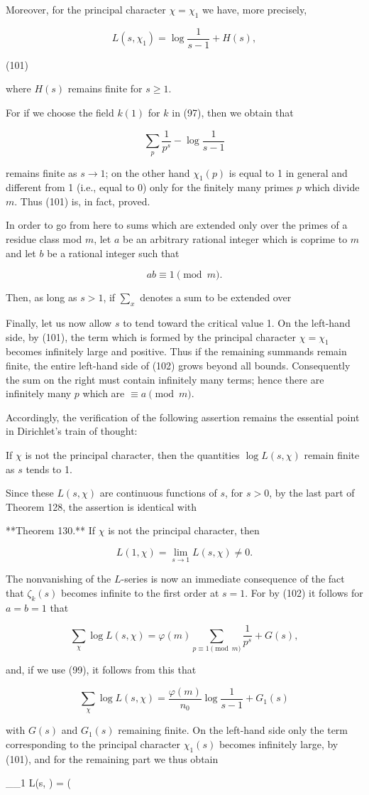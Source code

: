 Moreover, for the principal character $\chi = \chi_1$ we have, more precisely,

$$L(s,\chi_1) = \log \frac{1}{s-1} + H(s),$$

(101)

where $H(s)$ remains finite for $s \geq 1$.

For if we choose the field $k(1)$ for $k$ in (97), then we obtain that

$$\sum_p \frac{1}{p^s} - \log \frac{1}{s-1}$$

remains finite as $s \rightarrow 1$; on the other hand $\chi_1(p)$ is equal to 1 in general and different from 1 (i.e., equal to 0) only for the finitely many primes $p$ which divide $m$. Thus (101) is, in fact, proved.

In order to go from here to sums which are extended only over the primes of a residue class mod $m$, let $a$ be an arbitrary rational integer which is coprime to $m$ and let $b$ be a rational integer such that

$$ab \equiv 1 \pmod{m}.$$

Then, as long as $s > 1$, if $\sum_x$ denotes a sum to be extended over

Finally, let us now allow $s$ to tend toward the critical value 1. On the left-hand side, by (101), the term which is formed by the principal character $\chi = \chi_1$ becomes infinitely large and positive. Thus if the remaining summands remain finite, the entire left-hand side of (102) grows beyond all bounds. Consequently the sum on the right must contain infinitely many terms; hence there are infinitely many $p$ which are $\equiv a \pmod{m}$.

Accordingly, the verification of the following assertion remains the essential point in Dirichlet’s train of thought:

If $\chi$ is not the principal character, then the quantities $\log L(s, \chi)$ remain finite as $s$ tends to 1.

Since these $L(s, \chi)$ are continuous functions of $s$, for $s > 0$, by the last part of Theorem 128, the assertion is identical with

**Theorem 130.** If $\chi$ is not the principal character, then

$$L(1, \chi) = \lim_{s \to 1} L(s, \chi) \neq 0.$$

The nonvanishing of the $L$-series is now an immediate consequence of the fact that $\zeta_k(s)$ becomes infinite to the first order at $s = 1$. For by (102) it follows for $a = b = 1$ that

$$\sum_{\chi} \log L(s, \chi) = \varphi(m) \sum_{p \equiv 1 \pmod{m}} \frac{1}{p^s} + G(s),$$

and, if we use (99), it follows from this that

$$\sum_{\chi} \log L(s, \chi) = \frac{\varphi(m)}{n_0} \log \frac{1}{s - 1} + G_1(s)$$

with $G(s)$ and $G_1(s)$ remaining finite. On the left-hand side only the term corresponding to the principal character $\chi_1(s)$ becomes infinitely large, by (101), and for the remaining part we thus obtain

$$\sum_{\chi \neq \chi_1} \log L(s, \chi) = \left( \frac

